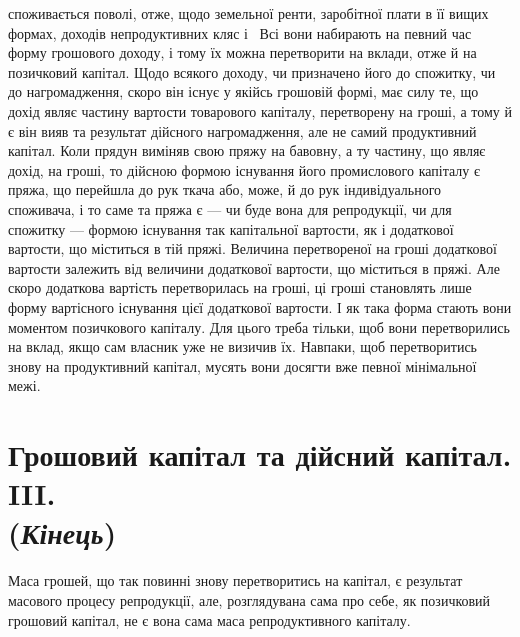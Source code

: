 \parcont{}  %
споживається поволі, отже, щодо земельної ренти, заробітної плати в її вищих
формах, доходів непродуктивних кляс і~ Всі вони набирають на певний
час форму грошового доходу, і тому їх можна перетворити на вклади, отже
й на позичковий капітал. Щодо всякого доходу, чи призначено його до спожитку,
чи до нагромадження, скоро він існує у якійсь грошовій формі, має
силу те, що дохід являє частину вартости товарового капіталу, перетворену на
гроші, а тому й є він вияв та результат дійсного нагромадження, але не самий
продуктивний капітал. Коли прядун виміняв свою пряжу на бавовну, а ту частину,
що являє дохід, на гроші, то дійсною формою існування його промислового
капіталу є пряжа, що перейшла до рук ткача або, може, й до рук індивідуального
споживача, і то саме та пряжа є — чи буде вона для репродукції, чи
для спожитку — формою існування так капітальної вартости, як і додаткової
вартости, що міститься в тій пряжі. Величина перетвореної на гроші додаткової
вартости залежить від величини додаткової вартости, що міститься в пряжі.
Але скоро додаткова вартість перетворилась на гроші, ці гроші становлять лише
форму вартісного існування цієї додаткової вартости. І як така форма стають
вони моментом позичкового капіталу. Для цього треба тільки, щоб вони перетворились
на вклад, якщо сам власник уже не визичив їх. Навпаки, щоб
перетворитись знову на продуктивний капітал, мусять вони досягти вже певної
мінімальної межі.

\section[Грошовий капітал та дійсний капітал. III. (Кінець)]{Грошовий капітал та дійсний капітал. III. \\ (\emph{Кінець})}

Маса грошей, що так повинні знову перетворитись на капітал, є результат
масового процесу репродукції, але, розглядувана сама про себе, як позичковий
грошовий капітал, не є вона сама маса репродуктивного капіталу.

